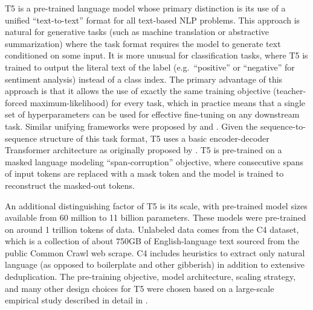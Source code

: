 \documentclass[11pt]{article}
\begin{document}
T5 is a pre-trained language model whose primary distinction is its use of a unified ``text-to-text'' format for all text-based NLP problems.
This approach is natural for generative tasks (such as machine translation or abstractive summarization) where the task format requires the model to generate text conditioned on some input.
It is more unusual for classification tasks, where T5 is trained to output the literal text of the label (e.g.\ ``positive'' or ``negative'' for sentiment analysis) instead of a class index.
The primary advantage of this approach is that it allows the use of exactly the same training objective (teacher-forced maximum-likelihood) for every task, which in practice means that a single set of hyperparameters can be used for effective fine-tuning on any downstream task.
Similar unifying frameworks were proposed by \citet{keskar2019unifying} and \citet{mccann2018natural}.
Given the sequence-to-sequence structure of this task format, T5 uses a basic encoder-decoder Transformer architecture as originally proposed by \citet{vaswani2017attention}.
T5 is pre-trained on a masked language modeling ``span-corruption'' objective, where consecutive spans of input tokens are replaced with a mask token and the model is trained to reconstruct the masked-out tokens.

An additional distinguishing factor of T5 is its scale, with pre-trained model sizes available from 60 million to 11 billion parameters.
These models were pre-trained on around 1 trillion tokens of data.
Unlabeled data comes from the C4 dataset, which is a collection of about 750GB of English-language text sourced from the public Common Crawl web scrape.
C4 includes heuristics to extract only natural language (as opposed to boilerplate and other gibberish) in addition to extensive deduplication.
The pre-training objective, model architecture, scaling strategy, and many other design choices for T5 were chosen based on a large-scale empirical study described in detail in \citet{2020t5}.
\end{document}
